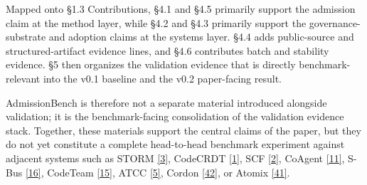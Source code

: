 \documentclass[9pt,letterpaper]{extarticle}
\begin{document}
Mapped onto §1.3 Contributions, §4.1 and §4.5 primarily support the admission claim at the method layer, while §4.2 and §4.3 primarily support the governance-substrate and adoption claims at the systems layer. §4.4 adds public-source and structured-artifact evidence lines, and §4.6 contributes batch and stability evidence. §5 then organizes the validation evidence that is directly benchmark-relevant into the v0.1 baseline and the v0.2 paper-facing result.

AdmissionBench is therefore not a separate material introduced alongside validation; it is the benchmark-facing consolidation of the validation evidence stack. Together, these materials support the central claims of the paper, but they do not yet constitute a complete head-to-head benchmark experiment against adjacent systems such as STORM \textcolor{atmLinkBlue}{\hyperlink{Item.39}{[3]}}, CodeCRDT \textcolor{atmLinkBlue}{\hyperlink{Item.37}{[1]}}, SCF \textcolor{atmLinkBlue}{\hyperlink{Item.38}{[2]}}, CoAgent \textcolor{atmLinkBlue}{\hyperlink{Item.47}{[11]}}, S-Bus \textcolor{atmLinkBlue}{\hyperlink{Item.52}{[16]}}, CodeTeam \textcolor{atmLinkBlue}{\hyperlink{Item.51}{[15]}}, ATCC \textcolor{atmLinkBlue}{\hyperlink{Item.41}{[5]}}, Cordon \textcolor{atmLinkBlue}{\hyperlink{Item.78}{[42]}}, or Atomix \textcolor{atmLinkBlue}{\hyperlink{Item.77}{[41]}}.
\end{document}
